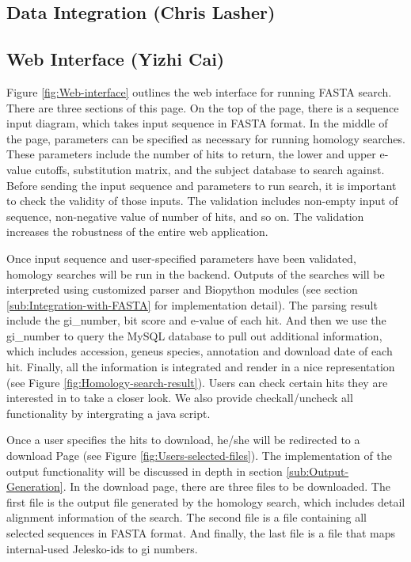 \documentclass[11pt,letterpaper,twoside,english]{article}
\begin{document}
\subsection{Data Integration (Chris Lasher)}

\subsection{Web Interface (Yizhi Cai)}

Figure \ref{fig:Web-interface} outlines the web interface for running
FASTA search. There are three sections of this page. On the top of
the page, there is a sequence input diagram, which takes input sequence
in FASTA format. In the middle of the page, parameters can be specified
as necessary for running homology searches. These parameters include
the number of hits to return, the lower and upper e-value cutoffs,
substitution matrix, and the subject database to search against. Before
sending the input sequence and parameters to run search, it is important
to check the validity of those inputs. The validation includes non-empty
input of sequence, non-negative value of number of hits, and so on.
The validation increases the robustness of the entire web application.

Once input sequence and user-specified parameters have been validated,
homology searches will be run in the backend. Outputs of the searches
will be interpreted using customized parser and Biopython modules
(see section \ref{sub:Integration-with-FASTA} for implementation
detail). The parsing result include the gi\_number, bit score and
e-value of each hit. And then we use the gi\_number to query the MySQL
database to pull out additional information, which includes accession,
geneus species, annotation and download date of each hit. Finally,
all the information is integrated and render in a nice representation
(see Figure \ref{fig:Homology-search-result}). Users can check certain
hits they are interested in to take a closer look. We also provide
checkall/uncheck all functionality by intergrating a java script.

Once a user specifies the hits to download, he/she will be redirected
to a download Page (see Figure \ref{fig:Users-selected-files}). The
implementation of the output functionality will be discussed in depth
in section \ref{sub:Output-Generation}. In the download page, there
are three files to be downloaded. The first file is the output file
generated by the homology search, which includes detail alignment
information of the search. The second file is a file containing all
selected sequences in FASTA format. And finally, the last file is
a file that maps internal-used Jelesko-ids to gi numbers.
\end{document}
